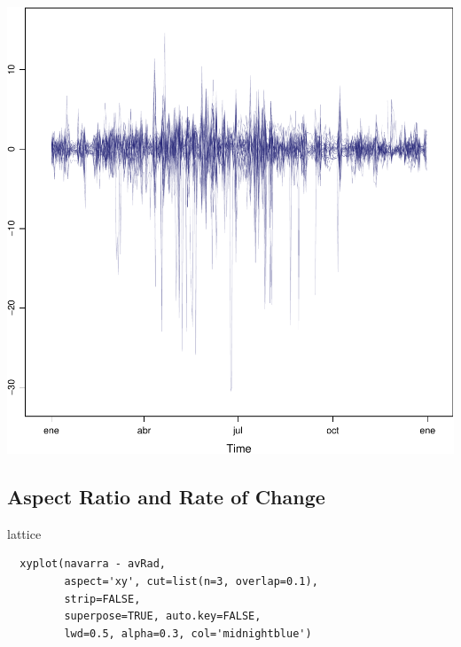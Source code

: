\documentclass[xcolor={usenames,svgnames,dvipsnames}]{beamer}
\begin{document}
\begin{frame}[label=sec-3-1-2]{}
\includegraphics[width=.9\linewidth]{figs/navarra.pdf}
\end{frame}

\subsection{Aspect Ratio and Rate of Change}
\label{sec-3-2}

\begin{frame}[fragile,label=sec-3-2-1]{lattice}
 \lstset{language=R,label= ,caption= ,numbers=none}
\begin{lstlisting}
  xyplot(navarra - avRad,
         aspect='xy', cut=list(n=3, overlap=0.1),
         strip=FALSE,
         superpose=TRUE, auto.key=FALSE,
         lwd=0.5, alpha=0.3, col='midnightblue')
\end{lstlisting}
\end{frame}
\end{document}

